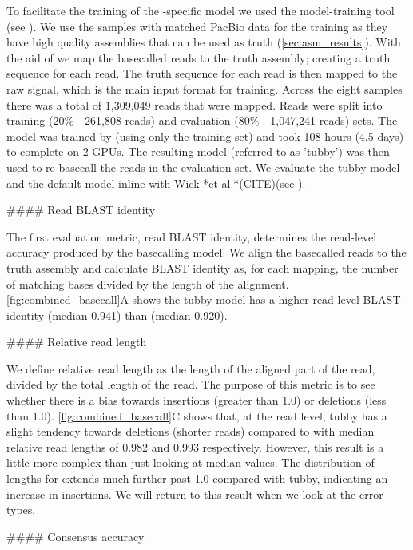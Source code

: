 \begin{markdown}
To facilitate the training of the \mtb{}-specific model we used the \ont{} model-training tool \taiyaki{} (see ). We use the samples with matched PacBio data for the training as they have high quality assemblies that can be used as truth (\autoref{sec:asm_results}). With the aid of \taiyaki{} we map the basecalled \ont{} reads to the truth assembly; creating a truth sequence for each read. The truth sequence for each read is then mapped to the raw signal, which is the main input format for training. Across the eight samples there was a total of 1,309,049 \ont{} reads that were mapped. Reads were split into training (20\% - 261,808 reads) and evaluation (80\% - 1,047,241 reads) sets. The model was trained by \taiyaki{} (using only the training set) and took 108 hours (4.5 days) to complete on 2 GPUs. The resulting \mtb{} model (referred to as 'tubby') was then used to re-basecall the reads in the evaluation set. We evaluate the tubby model and the default \guppy{} model inline with Wick *et al.*(CITE)(see ).

#### Read BLAST identity

The first evaluation metric, read BLAST identity, determines the read-level accuracy produced by the basecalling model. We align the basecalled reads to the truth assembly and calculate BLAST identity as, for each mapping, the number of matching bases divided by the length of the alignment. \autoref{fig:combined_basecall}A shows the tubby model has a higher read-level BLAST identity (median 0.941) than \guppy{} (median 0.920).

#### Relative read length

We define relative read length as the length of the aligned part of the read, divided by the total length of the read. The purpose of this metric is to see whether there is a bias towards insertions (greater than 1.0) or deletions (less than 1.0). \autoref{fig:combined_basecall}C shows that, at the read level, tubby has a slight tendency towards deletions (shorter reads) compared to \guppy{} with median relative read lengths of 0.982 and 0.993 respectively. However, this result is a little more complex than just looking at median values. The distribution of lengths for \guppy{} extends much further past 1.0 compared with tubby, indicating an increase in insertions. We will return to this result when we look at the error types.

#### Consensus accuracy


\end{markdown}
